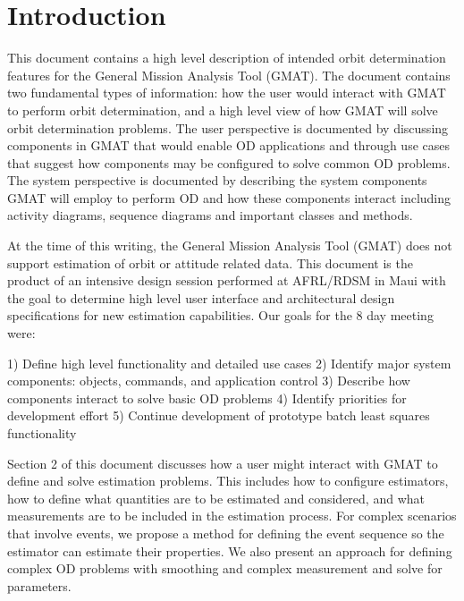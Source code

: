 \documentclass[letterpaper,10pt]{book}
\begin{document}

\thispagestyle{empty}



\tableofcontents

\chapter{Introduction}

This document contains a high level description of intended orbit
determination features for the General Mission Analysis Tool (GMAT).
The document contains two fundamental types of information:  how the
user would interact with GMAT to perform orbit determination, and a
high level view of how GMAT will solve orbit determination problems.
The user perspective is documented by discussing components in GMAT
that would  enable OD applications and through use cases that
suggest how components may be configured to solve common OD
problems.    The system perspective is documented by describing the
system components GMAT will employ to perform OD and how these
components interact including activity diagrams, sequence diagrams
and important classes and methods.

At the time of this writing, the General Mission Analysis Tool
(GMAT) does not support estimation of orbit or attitude related
data.   This document is the product of an intensive design session
performed at AFRL/RDSM in Maui with the goal to determine high level
user interface and architectural design specifications for new
estimation capabilities.   Our goals for the 8 day meeting were:

1)  Define high level functionality and detailed use cases 2)
Identify major system components:  objects, commands, and
application control 3)  Describe how components interact to solve
basic OD problems 4)  Identify priorities for development effort 5)
Continue development of prototype batch least squares functionality

Section 2 of this document  discusses how a user might interact with
GMAT to define and solve estimation problems.  This includes how to
configure estimators, how to define what quantities are to be
estimated and considered, and what measurements are to be included
in the estimation process.  For complex scenarios that involve
events, we propose a method for defining the event sequence so the
estimator can estimate their properties.  We also present an
approach for defining complex OD problems with smoothing and complex
measurement and solve for parameters.
\end{document}
